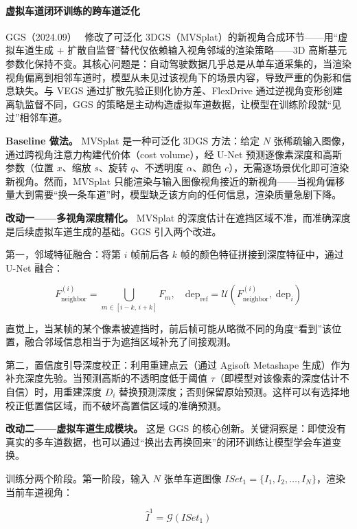 \paragraph{虚拟车道闭环训练的跨车道泛化}

GGS（2024.09）~\cite{2409_02382} 修改了可泛化 3DGS（MVSplat）的新视角合成环节——用``虚拟车道生成 + 扩散自监督''替代仅依赖输入视角邻域的渲染策略——3D 高斯基元参数化保持不变。其核心问题是：自动驾驶数据几乎总是从单车道采集的，当渲染视角偏离到相邻车道时，模型从未见过该视角下的场景内容，导致严重的伪影和信息缺失。与 VEGS 通过扩散先验正则化协方差、FlexDrive 通过逆视角变形创建离轨监督不同，GGS 的策略是主动构造虚拟车道数据，让模型在训练阶段就``见过''相邻车道。

\textbf{Baseline 做法。} MVSplat 是一种可泛化 3DGS 方法：给定 $N$ 张稀疏输入图像，通过跨视角注意力构建代价体（cost volume），经 U-Net 预测逐像素深度和高斯参数（位置 $x$、缩放 $s$、旋转 $q$、不透明度 $\alpha$、颜色 $c$），无需逐场景优化即可渲染新视角。然而，MVSplat 只能渲染与输入图像视角接近的新视角——当视角偏移量大到需要``换一条车道''时，模型缺乏该方向的任何信息，渲染质量急剧下降。

\textbf{改动一——多视角深度精化。} MVSplat 的深度估计在遮挡区域不准，而准确深度是后续虚拟车道生成的基础。GGS 引入两个改进。

第一，邻域特征融合：将第 $i$ 帧前后各 $k$ 帧的颜色特征拼接到深度特征中，通过 U-Net 融合：

\begin{equation}
F_{\text{neighbor}}^{(i)} = \bigcup_{m \in [i-k,\, i+k]} F_m, \quad \text{dep}_{\text{ref}} = \mathcal{U}(F_{\text{neighbor}}^{(i)},\; \text{dep}_i)
\end{equation}

直觉上，当某帧的某个像素被遮挡时，前后帧可能从略微不同的角度``看到''该位置，融合邻域信息相当于为遮挡区域补充了间接观测。

第二，置信度引导深度校正：利用重建点云（通过 Agisoft Metashape 生成）作为补充深度先验。当预测高斯的不透明度低于阈值 $\tau$（即模型对该像素的深度估计不自信）时，用重建深度 $D_i$ 替换预测深度；否则保留原始预测。这样可以有选择地校正低置信区域，而不破坏高置信区域的准确预测。

\textbf{改动二——虚拟车道生成模块。} 这是 GGS 的核心创新。关键洞察是：即使没有真实的多车道数据，也可以通过``换出去再换回来''的闭环训练让模型学会车道变换。

训练分两个阶段。第一阶段，输入 $N$ 张单车道图像 $ISet_1 = \{I_1, I_2, \ldots, I_N\}$，渲染当前车道视角：

\begin{equation}
\hat{I}^1 = \mathcal{G}(ISet_1)
\end{equation}

